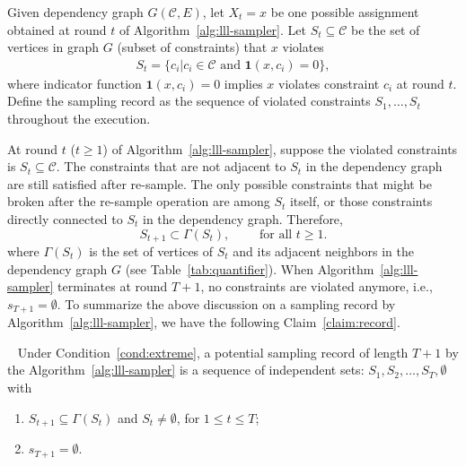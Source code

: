\begin{definition} \label{def:record} 
Given dependency graph $G(\mathcal{C},E)$, let $X_t=x$ be  one possible assignment obtained at round $t$ of Algorithm~\ref{alg:lll-sampler}. Let $S_t\subseteq \mathcal{C}$ be the set of vertices in graph $G$ (subset of constraints) that $x$ violates
\begin{align}
    S_t = \{c_i|c_i\in \mathcal{C}\text{ and } \mathbf{1}(x,c_i)=0\},
\end{align}
where indicator function $\mathbf{1}(x,c_i)=0$ implies  $x$ violates constraint $c_i$  at round $t$.
Define the sampling record as the sequence of violated constraints  $S_1,\ldots,S_t$ throughout the execution.
\end{definition}






At round $t$  ($t \geq 1$) of Algorithm~\ref{alg:lll-sampler}, suppose the violated constraints is $S_t\subseteq \mathcal{C}$. The constraints that are not adjacent to $S_t$ in the dependency graph are still satisfied after re-sample. The only possible constraints that might be broken after the re-sample operation are among $S_t$ itself, or those constraints directly connected to  $S_t$ in the dependency graph. Therefore,
\begin{equation*}
S_{t+1} \subset \Gamma(S_t),    \qquad \text{ for all } t\ge 1.
\end{equation*}
where $\Gamma(S_t)$ is the set of vertices of $S_t$ and its adjacent neighbors
in the dependency graph $G$ (see Table~\ref{tab:quantifier}).  When Algorithm~\ref{alg:lll-sampler} terminates at round $T+1$, no  constraints are violated anymore, i.e., $s_{T+1}=\emptyset$.  To summarize the above discussion on a sampling record by Algorithm~\ref{alg:lll-sampler}, we have the following Claim~\ref{claim:record}.
\begin{claim}~\label{claim:record}
Under Condition~\ref{cond:extreme}, a potential sampling record of length $T+1$ by the Algorithm~\ref{alg:lll-sampler} is a sequence of independent sets: $S_1, S_2, \ldots,S_T,\emptyset$ with 
\begin{enumerate}
    \item $S_{t+1} \subseteq \Gamma(S_{t})$ and $S_t\neq\emptyset$, for $1 \leq t\leq T$; 
    \item $s_{T+1}=\emptyset$.
\end{enumerate}
\end{claim}






